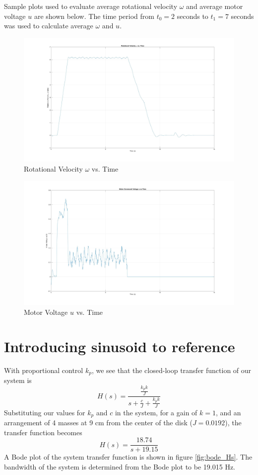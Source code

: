 \documentclass[11pt,titlepage]{article}
\begin{document}
\noindent Sample plots used to evaluate average rotational velocity $\omega$ and average motor voltage $u$ are shown below. The time period from $t_0=2$ seconds to $t_1=7$ seconds was used to calculate average $\omega$ and $u$.

	\begin{figure}[H]
		\centering
		\includegraphics[scale=0.15]{w_vs_time}
		\caption{Rotational Velocity $\omega$ vs. Time}
		\label{fig:w_vs_time}
	\end{figure}

	\begin{figure}[H]
		\centering
		\includegraphics[scale=0.15]{u_vs_time}
		\caption{Motor Voltage $u$ vs. Time}
		\label{fig:u_vs_time}
	\end{figure}
	
\section{Introducing sinusoid to reference}
	With proportional control $k_p$, we see that the closed-loop transfer function of our system is 
	\begin{equation}
		H(s)=\frac{\frac{k_pk}{J}}{s+\frac{c}{J}+\frac{k_pk}{J}}
	\end{equation}
	Substituting our values for $k_p$ and $c$ in the system, for a gain of $k=1$, and an arrangement of 4 masses at 9 cm from the center of the disk ($J = 0.0192$), the transfer function becomes 
	\begin{equation}
		H(s)=\frac{18.74}{s + 19.15}
	\end{equation}
	A Bode plot of the system transfer function is shown in figure \ref{fig:bode_Hs}. The bandwidth of the system is determined from the Bode plot to be 19.015 Hz.
\end{document}
